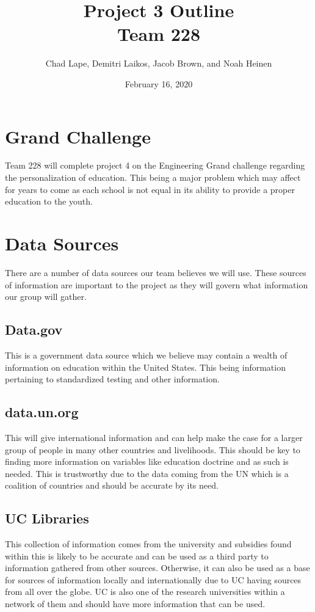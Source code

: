 \documentclass[11pt]{article}
\title{Project 3 Outline \\
	\large Team 228}
\author{Chad Lape, Demitri Laikos, Jacob Brown, and Noah Heinen}
\date{February 16, 2020}
\begin{document}
	\maketitle
	
	\tableofcontents
	
	\newpage
	\section{Grand Challenge}
	
	Team 228 will complete project 4 on the Engineering Grand challenge regarding the personalization of education. This being a major problem which may affect for years to come as each school is not equal in its ability to provide a proper education to the youth.
	
	\newpage
	\section{Data Sources}
	There are a number of data sources our team believes we will use. These sources of information are important to the project as they will govern what information our group will gather. 
	
	\subsection{Data.gov}
	This is a government data source which we believe may contain a wealth of information on education within the United States. This being information pertaining to standardized testing and other information.
	
	\subsection{data.un.org}
	This will give international information and can help make the case for a larger group of people in many other countries and livelihoods. This should be key to finding more information on variables like education doctrine and as such is needed. This is trustworthy due to the data coming from the UN which is a coalition of countries and should be accurate by its need.
	
	\subsection{UC Libraries}
	This collection of information comes from the university and subsidies found within this is likely to be accurate and can be used as a third party to information gathered from other sources. Otherwise, it can also be used as a base for sources of information locally and internationally due to UC having sources from all over the globe. UC is also one of the research universities within a network of them and should have more information that can be used.
	
\end{document}

